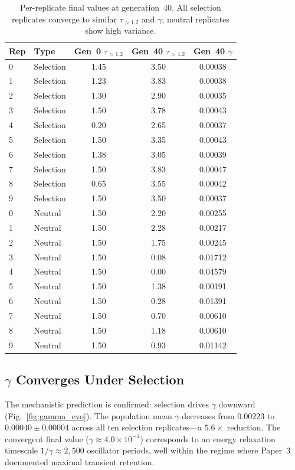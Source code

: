 \documentclass[twocolumn,showpacs,preprintnumbers,amsmath,amssymb,prd,floatfix]{revtex4-2}
\newcommand{\tauexp}{\tau_{>1.2}}
\begin{document}
\begin{table}[b]
\centering
\caption{Per-replicate final values at generation~40. All selection replicates converge to similar $\tauexp$ and $\gamma$; neutral replicates show high variance.}
\label{tab:results_summary}
\begin{tabular}{llccc}
\toprule
Rep & Type & Gen~0 $\tauexp$ & Gen~40 $\tauexp$ & Gen~40 $\gamma$ \\
\midrule
0  & Selection & 1.45 & 3.50 & 0.00038 \\
1  & Selection & 1.23 & 3.83 & 0.00038 \\
2  & Selection & 1.30 & 2.90 & 0.00035 \\
3  & Selection & 1.50 & 3.78 & 0.00043 \\
4  & Selection & 0.20 & 2.65 & 0.00037 \\
5  & Selection & 1.50 & 3.35 & 0.00043 \\
6  & Selection & 1.38 & 3.05 & 0.00039 \\
7  & Selection & 1.50 & 3.83 & 0.00047 \\
8  & Selection & 0.65 & 3.55 & 0.00042 \\
9  & Selection & 1.50 & 3.50 & 0.00037 \\
\midrule
0  & Neutral   & 1.50 & 2.20 & 0.00255 \\
1  & Neutral   & 1.50 & 2.28 & 0.00217 \\
2  & Neutral   & 1.50 & 1.75 & 0.00245 \\
3  & Neutral   & 1.50 & 0.08 & 0.01712 \\
4  & Neutral   & 1.50 & 0.00 & 0.04579 \\
5  & Neutral   & 1.50 & 1.38 & 0.00191 \\
6  & Neutral   & 1.50 & 0.28 & 0.01391 \\
7  & Neutral   & 1.50 & 0.70 & 0.00610 \\
8  & Neutral   & 1.50 & 1.18 & 0.00610 \\
9  & Neutral   & 1.50 & 0.93 & 0.01142 \\
\bottomrule
\end{tabular}
\end{table}

\subsection{$\gamma$ Converges Under Selection}

The mechanistic prediction is confirmed: selection drives $\gamma$ downward (Fig.~\ref{fig:gamma_evo}). The population mean $\gamma$ decreases from $0.00223$ to $0.00040 \pm 0.00004$ across all ten selection replicates---a $5.6\times$ reduction. The convergent final value ($\gamma \approx 4.0 \times 10^{-4}$) corresponds to an energy relaxation timescale $1/\gamma \approx 2{,}500$ oscillator periods, well within the regime where Paper~3 documented maximal transient retention.
\end{document}
